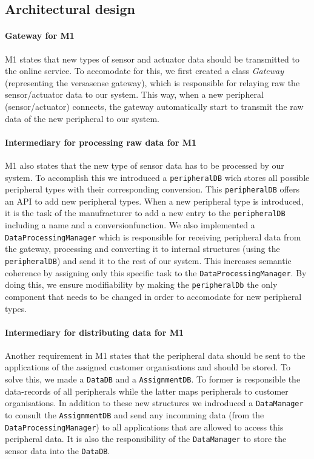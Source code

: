 \documentclass[english]{sareport}
\begin{document}
\subsection{Architectural design}
\paragraph{Gateway for M1}
M1 states that new types of sensor and actuator data should be transmitted to the online service. To accomodate for this, we first created a class \textit{Gateway} (representing the versasense gateway), which is responsible for relaying raw the sensor/actuator data to our system. This way, when a new peripheral (sensor/actuator) connects, the gateway automatically start to transmit the raw data of the new peripheral to our system.
\paragraph{Intermediary for processing raw data for M1}
M1 also states that the new type of sensor data has to be processed by our system. To accomplish this we introduced a \texttt{peripheralDB} wich stores all possible peripheral types with their corresponding conversion. This \texttt{peripheralDB} offers an API to add new peripheral types. When a new peripheral type is introduced, it is the task of the manufracturer to add a new entry to the \texttt{peripheralDB} including a name and a conversionfunction. We also implemented a \texttt{DataProcessingManager} which is responsible for receiving peripheral data from the gateway, processing and converting it to internal structures (using the \texttt{peripheralDB}) and send it to the rest of our system. This increases semantic coherence by assigning only this specific task to the \texttt{DataProcessingManager}. By doing this, we ensure modifiability by making the \texttt{peripheralDb} the only component that needs to be changed in order to accomodate for new peripheral types.
\paragraph{Intermediary for distributing data for M1}
Another requirement in M1 states that the peripheral data should be sent to the applications of the assigned customer organisations and should be stored. To solve this, we made a \texttt{DataDB} and a \texttt{AssignmentDB}. To former is responsible the data-records of all peripherals while the latter maps peripherals to customer organisations. In addition to these new structures we indroduced a \texttt{DataManager} to consult the \texttt{AssignmentDB} and send any incomming data (from the \texttt{DataProcessingManager}) to all applications that are allowed to access this peripheral data. It is also the responsibility of the \texttt{DataManager} to store the sensor data into the \texttt{DataDB}.
\end{document}
